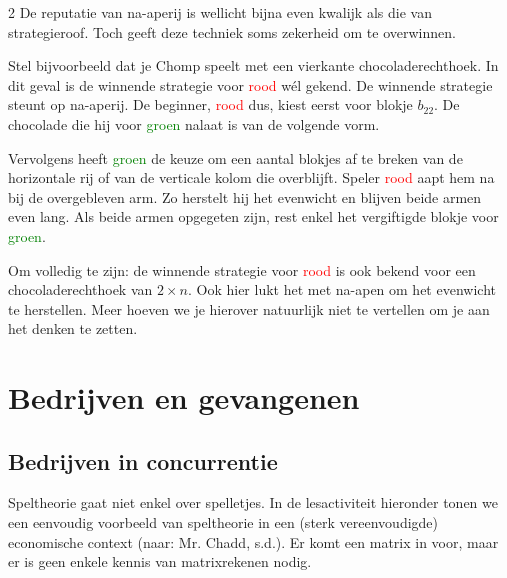 \begin{multicols}{2}
De reputatie van na-aperij is wellicht bijna even kwalijk als die van strategieroof. Toch geeft deze techniek soms zekerheid om te overwinnen. 

Stel bijvoorbeeld dat je Chomp speelt met een vierkante chocoladerechthoek. In dit geval is de winnende strategie voor \textcolor{red}{rood} wél gekend. De winnende strategie steunt op na-aperij. De beginner, \textcolor{red}{rood} dus, kiest eerst voor blokje $b_{22}$. De chocolade die hij voor \textcolor{green}{groen} nalaat is van de volgende vorm. 


Vervolgens heeft \textcolor{green}{groen} de keuze om een aantal blokjes af te breken van de horizontale rij of van de verticale kolom die overblijft. Speler \textcolor{red}{rood} aapt hem na bij de overgebleven arm. Zo herstelt hij het evenwicht en blijven beide armen even lang. Als beide armen opgegeten zijn, rest enkel het vergiftigde blokje voor \textcolor{green}{groen}.

Om volledig te zijn: de winnende strategie voor \textcolor{red}{rood} is ook bekend voor een chocoladerechthoek van $2 \times n$. Ook hier lukt het met na-apen om het evenwicht te herstellen. Meer hoeven we je hierover natuurlijk niet te vertellen om je aan het denken te zetten.\clearpage

\section{Bedrijven en gevangenen}\label{sec:companiesandprisoners}

\subsection{Bedrijven in concurrentie}

Speltheorie gaat niet enkel over spelletjes. In de lesactiviteit hieronder tonen we een eenvoudig voorbeeld van speltheorie in een (sterk vereenvoudigde) economische context (naar: Mr. Chadd, s.d.). Er komt een matrix in voor, maar er is geen enkele kennis van matrixrekenen nodig.
\end{multicols}

